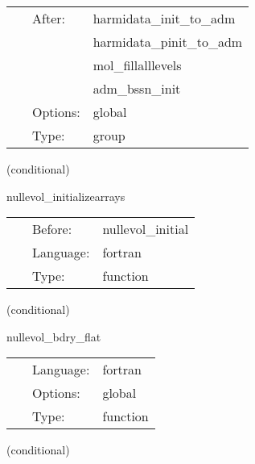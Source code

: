  \begin{tabular*}{160mm}{cll} 
~ & After:  & harmidata\_init\_to\_adm \\ 
~& ~ &harmidata\_pinit\_to\_adm\\ 
~& ~ &mol\_fillalllevels\\ 
~& ~ &adm\_bssn\_init\\ 
~ & Options:  & global \\ 
~ & Type:  & group \\ 
\end{tabular*} 


\vspace{5mm}

   (conditional) 

\hspace{5mm} nullevol\_initializearrays 

\hspace{5mm}{\it initialize all arrays to large values } 


\hspace{5mm}

 \begin{tabular*}{160mm}{cll} 
~ & Before:  & nullevol\_initial \\ 
~ & Language:  & fortran \\ 
~ & Type:  & function \\ 
\end{tabular*} 


\vspace{5mm}

   (conditional) 

\hspace{5mm} nullevol\_bdry\_flat 

\hspace{5mm}{\it give flat boundary conditions for the null metric } 


\hspace{5mm}

 \begin{tabular*}{160mm}{cll} 
~ & Language:  & fortran \\ 
~ & Options:  & global \\ 
~ & Type:  & function \\ 
\end{tabular*} 


\vspace{5mm}

   (conditional) 


